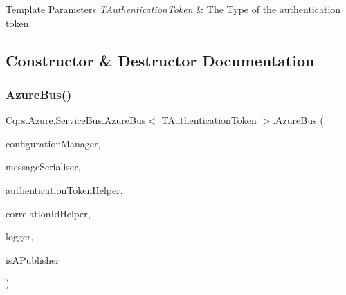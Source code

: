 \begin{DoxyTemplParams}{Template Parameters}
{\em T\+Authentication\+Token} & The Type of the authentication token.\\
\hline
\end{DoxyTemplParams}


\subsection{Constructor \& Destructor Documentation}
\mbox{\label{classCqrs_1_1Azure_1_1ServiceBus_1_1AzureBus_a1046ff74282fd178f43e28420433d2a9_a1046ff74282fd178f43e28420433d2a9}} 
\subsubsection{\texorpdfstring{Azure\+Bus()}{AzureBus()}}
{\footnotesize\ttfamily \hyperlink{classCqrs_1_1Azure_1_1ServiceBus_1_1AzureBus}{Cqrs.\+Azure.\+Service\+Bus.\+Azure\+Bus}$<$ T\+Authentication\+Token $>$.\hyperlink{classCqrs_1_1Azure_1_1ServiceBus_1_1AzureBus}{Azure\+Bus} (\begin{DoxyParamCaption}\item[{\hyperlink{interfaceCqrs_1_1Configuration_1_1IConfigurationManager}{I\+Configuration\+Manager}}]{configuration\+Manager,  }\item[{\hyperlink{interfaceCqrs_1_1Azure_1_1ServiceBus_1_1IMessageSerialiser}{I\+Message\+Serialiser}$<$ T\+Authentication\+Token $>$}]{message\+Serialiser,  }\item[{\hyperlink{interfaceCqrs_1_1Authentication_1_1IAuthenticationTokenHelper}{I\+Authentication\+Token\+Helper}$<$ T\+Authentication\+Token $>$}]{authentication\+Token\+Helper,  }\item[{I\+Correlation\+Id\+Helper}]{correlation\+Id\+Helper,  }\item[{I\+Logger}]{logger,  }\item[{bool}]{is\+A\+Publisher }\end{DoxyParamCaption})\hspace{0.3cm}{\ttfamily [protected]}}



